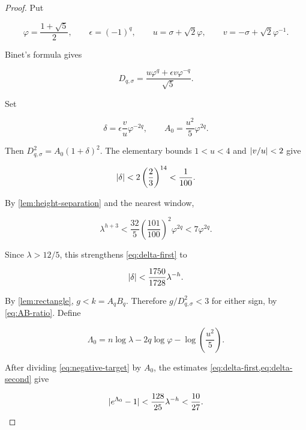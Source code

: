 \begin{proof}
Put

\begin{equation}
 \varphi=\frac{1+\sqrt5}{2},
 \qquad
 \epsilon=(-1)^q,
 \qquad
 u=\sigma+\sqrt2\varphi,
 \qquad
 v=-\sigma+\sqrt2\varphi^{-1}.
 \label{eq:u-v}
\end{equation}

Binet's formula gives

\begin{equation}
 D_{q,\sigma}
 =\frac{u\varphi^q+\epsilon v\varphi^{-q}}{\sqrt5}.
 \label{eq:D-binet}
\end{equation}

Set

\begin{equation}
 \delta=\epsilon\frac vu\varphi^{-2q},
 \qquad
 A_0=\frac{u^2}{5}\varphi^{2q}.
\end{equation}

Then $D_{q,\sigma}^2=A_0(1+\delta)^2$. The elementary bounds
$1<u<4$ and $\lvert v/u\rvert<2$ give

\begin{equation}
 \lvert\delta\rvert<2\left(\frac23\right)^{14}<\frac1{100}.
 \label{eq:delta-first}
\end{equation}

By \cref{lem:height-separation} and the nearest window,

\begin{equation}
 \lambda^{h+3}<\frac{32}{5}\left(\frac{101}{100}\right)^2
 \varphi^{2q}<7\varphi^{2q}.
\end{equation}

Since $\lambda>12/5$, this strengthens \cref{eq:delta-first} to

\begin{equation}
 \lvert\delta\rvert<\frac{1750}{1728}\lambda^{-h}.
 \label{eq:delta-second}
\end{equation}

By \cref{lem:rectangle}, $g<k=A_qB_q$. Therefore
$g/D_{q,\sigma}^2<3$ for either sign, by \cref{eq:AB-ratio}. Define

\begin{equation}
 \Lambda_0=n\log\lambda-2q\log\varphi
 -\log\left(\frac{u^2}{5}\right).
 \label{eq:Lambda0}
\end{equation}

After dividing \cref{eq:negative-target} by $A_0$, the estimates
\cref{eq:delta-first,eq:delta-second} give

\begin{equation}
 \lvert e^{\Lambda_0}-1\rvert<\frac{128}{25}\lambda^{-h}<\frac{10}{27}.
\end{equation}


\end{proof}
